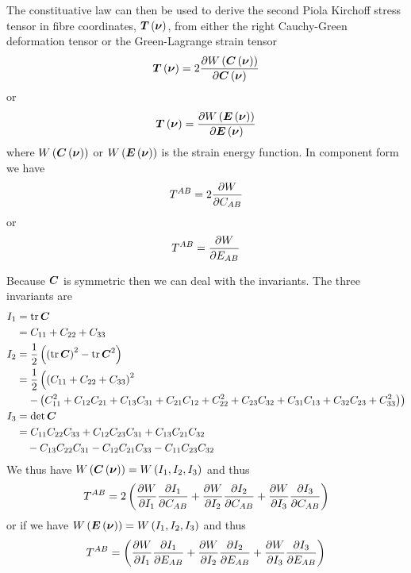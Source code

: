 The constituative law can then be used to derive the second Piola Kirchoff
stress tensor in fibre coordinates, $ \boldsymbol{T}\left( \boldsymbol{\nu} \right) $, from
either the right Cauchy-Green deformation tensor or the Green-Lagrange strain
tensor \ie
\begin{equation}
   \boldsymbol{T}\left( \boldsymbol{\nu} \right) =2 \dfrac{\partial  W\left(  \boldsymbol{C}\left( \boldsymbol{\nu} \right)  \right) }{\partial  \boldsymbol{C}\left( \boldsymbol{\nu} \right) } 
\end{equation}
or
\begin{equation}
   \boldsymbol{T}\left( \boldsymbol{\nu} \right) = \dfrac{\partial  W\left(  \boldsymbol{E}\left( \boldsymbol{\nu} \right)  \right) }{\partial  \boldsymbol{E}\left( \boldsymbol{\nu} \right) } 
\end{equation}
where $ W\left(  \boldsymbol{C}\left( \boldsymbol{\nu} \right)  \right) $ or
$ W\left(  \boldsymbol{E}\left( \boldsymbol{\nu} \right)  \right) $ is the strain energy
function. In component form we have
\begin{equation}
  T^{AB}=2 \dfrac{\partial W}{\partial C_{AB}} 
\end{equation}
or
\begin{equation}
  T^{AB}= \dfrac{\partial W}{\partial E_{AB}} 
\end{equation}

Because $\boldsymbol{C}$ is symmetric then we can deal with the invariants. The
three invariants are
\begin{equation}
  \begin{split}
    I_{1} &= \operatorname{tr}\boldsymbol{C} \\
    &= C_{11} + C_{22} + C_{33} \\
    I_{2} &=
    \dfrac{1}{2}\left( \left( \operatorname{tr}\boldsymbol{C} \right)^{2}-\operatorname{tr}\boldsymbol{C}^{2} \right) \\
    &=
    \dfrac{1}{2}\left(\left( C_{11}+C_{22}+C_{33} \right)^{2}\right. \\
      & \quad\left.-\left( C_{11}^{2}+C_{12}C_{21}+C_{13}C_{31}+
        C_{21}C_{12}+C_{22}^{2}+C_{23}C_{32}+C_{31}C_{13}+C_{32}C_{23}+C_{33}^{2} \right)\right) \\
    I_{3} &= \det{\ensuremath{\boldsymbol{C}}} \\
    &=C_{11}C_{22}C_{33}+C_{12}C_{23}C_{31}+C_{13}C_{21}C_{32}\\
    &\quad-C_{13}C_{22}C_{31}-C_{12}C_{21}C_{33}-C_{11}C_{23}C_{32}
  \end{split}
\end{equation}
We thus have
$ W\left(  \boldsymbol{C}\left( \boldsymbol{\nu} \right)  \right) = W\left( I_{1},I_{2},I_{3} \right) $ and
thus
\begin{equation}
  T^{AB}=2\left(  \dfrac{\partial W}{\partial I_{1}}  \dfrac{\partial I_{1}}{\partial C_{AB}} + \dfrac{\partial W}{\partial I_{2}}  \dfrac{\partial I_{2}}{\partial C_{AB}} + \dfrac{\partial W}{\partial I_{3}}  \dfrac{\partial I_{3}}{\partial C_{AB}}  \right)
\end{equation}
or if we have
$ W\left(  \boldsymbol{E}\left( \boldsymbol{\nu} \right)  \right) = W\left( I_{1},I_{2},I_{3} \right) $ and
thus
\begin{equation}
  T^{AB}=\left(  \dfrac{\partial W}{\partial I_{1}}  \dfrac{\partial I_{1}}{\partial E_{AB}} + \dfrac{\partial W}{\partial I_{2}}  \dfrac{\partial I_{2}}{\partial E_{AB}} + \dfrac{\partial W}{\partial I_{3}}  \dfrac{\partial I_{3}}{\partial E_{AB}}  \right)
\end{equation}


